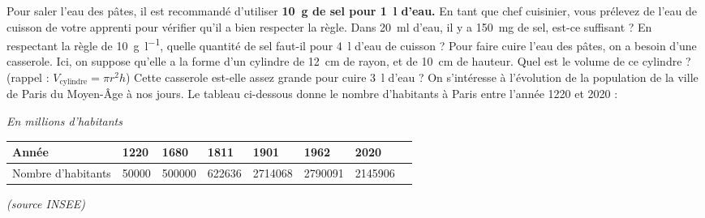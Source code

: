 \documentclass[../Cours.tex]{subfiles}
\begin{document}
\begin{questions}
    \clearpage
    Pour saler l'eau des pâtes, il est recommandé d'utiliser \textbf{\qty{10}{\gram} de sel pour \qty{1}{\litre} d'eau.}
    \question En tant que chef cuisinier, vous prélevez de l'eau de cuisson de votre apprenti pour vérifier qu'il a bien respecter la règle. Dans \qty{20}{\ml} d'eau, il y a \qty{150}{\milli\gram} de sel, est-ce suffisant ?
    \question En respectant la règle de \qty{10}{\gram\per\litre}, quelle quantité de sel faut-il pour \qty{4}{\litre} d'eau de cuisson ?
    \question Pour faire cuire l'eau des pâtes, on a besoin d'une casserole. Ici, on suppose qu'elle a la forme d'un cylindre de \qty{12}{\centi\metre} de rayon, et de \qty{10}{\centi\metre} de hauteur.
        \subquestion Quel est le volume de ce cylindre ? (rappel : $V_{\mbox{cylindre}} = \pi r^2 h$)
        \subquestion Cette casserole est-elle assez grande pour cuire \qty{3}{\litre} d'eau ?
    \clearpage
    On s'intéresse à l'évolution de la population de la ville de Paris du Moyen-Âge à nos jours. Le tableau ci-dessous donne le nombre d'habitants à Paris entre l'année 1220 et 2020 :
    \begin{center}
        \begin{flushright}
            \textit{En millions d'habitants}
        \end{flushright}
        \begin{tabularx}{0.9\linewidth}{|l|X|X|X|X|X|X|X|}\hline
            Année & 1220 & 1680 & 1811 & 1901 & 1962 & 2020  \\\hline
            Nombre d'habitants & \num{50000} & \num{500000} & \num{622636} & \num{2714068} & \num{2790091} & \num{2145906} \\\hline
        \end{tabularx}
        \begin{flushright}\vspace{-0.8em}
            \textit{(source INSEE)}
        \end{flushright}
    \end{center}


\end{questions}
\end{document}

